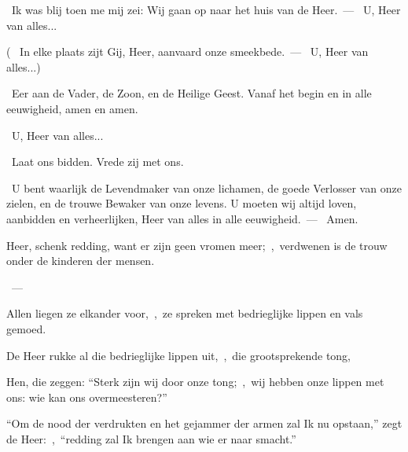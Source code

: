 \documentclass[12pt,twoside,a5paper]{article}
\begin{document}
\begin{halfparskip}
  \dd~Ik was blij toen me mij zei: Wij gaan op naar het huis van de Heer.~--- \rr~U, Heer van alles...

  ( \dd~In elke plaats zijt Gij, Heer, aanvaard onze smeekbede.~--- \rr~U, Heer van alles...)

  \cc~Eer aan de Vader, de Zoon, en de Heilige Geest. Vanaf het begin en in alle eeuwigheid, amen en amen.

  \rr~U, Heer van alles...

  \dd~Laat ons bidden. Vrede zij met ons.

  \cc~U bent waarlijk de Levendmaker van onze lichamen, de goede Verlosser van onze zielen, en de trouwe Bewaker van onze levens. U moeten wij altijd loven, aanbidden en verheerlijken, Heer van alles in alle eeuwigheid.~--- \rr~Amen.
\end{halfparskip}




\begin{halfparskip}
   
\end{halfparskip}

\begin{halfparskip}
  Heer, schenk redding, want er zijn geen vromen meer;~\sep\ verdwenen is de trouw onder de kinderen der mensen.

  ~--- 

  Allen liegen ze elkander voor,~\sep\ ze spreken met bedrieglijke lippen en vals gemoed.

  De Heer rukke al die bedrieglijke lippen uit,~\sep\ die grootsprekende tong,

  Hen, die zeggen: ``Sterk zijn wij door onze tong;~\sep\ wij hebben onze lippen met ons: wie kan ons overmeesteren?''

  ``Om de nood der verdrukten en het gejammer der armen zal Ik nu opstaan,'' zegt de Heer:~\sep\ ``redding zal Ik brengen aan wie er naar smacht.''
\end{halfparskip}

\begin{halfparskip}
   
\end{halfparskip}
\end{document}
